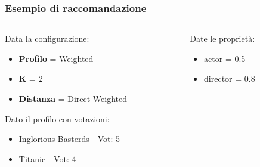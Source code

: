 \documentclass{beamer}
\begin{document}
\begin{frame}
	\frametitle{Esempio di raccomandazione}
	\begin{columns}[t]
		\begin{column}{0.5\textwidth}
			Data la configurazione:
			\begin{itemize}
				\item \textbf{Profilo} = Weighted 
				\item \textbf{K} = 2
				\item \textbf{Distanza} = Direct Weighted
			\end{itemize}
			
			
			\pause
			Dato il profilo con votazioni:
			\begin{itemize}
				\item Inglorious Basterds - Vot: 5
				\item Titanic - Vot: 4		
			\end{itemize} 
		\end{column}
		\begin{column}{0.5\textwidth}
			\pause
			Date le proprietà:
			\begin{itemize}
				\item actor = 0.5
				\item director = 0.8
			\end{itemize}
		\end{column}
	\end{columns}
\end{frame}

\end{document}
